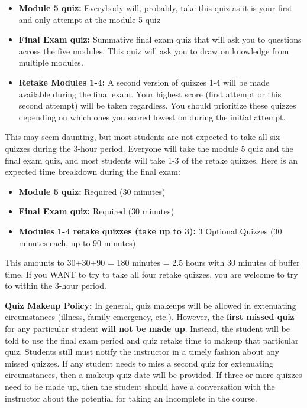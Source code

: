 \documentclass[12pt]{article}
\begin{document}
\begin{itemize}
\item  \textbf{Module 5 quiz:} Everybody will, probably, take this quiz as it is your first and only attempt at the module 5 quiz
\item \textbf{Final Exam quiz:} Summative final exam quiz that will ask you to questions across the five modules. This quiz will ask you to draw on knowledge from multiple modules.
\item \textbf{Retake Modules 1-4:} A second version of quizzes 1-4 will be made available during the final exam. Your highest score (first attempt or this second attempt) will be taken regardless. You should prioritize these quizzes depending on which ones you scored lowest on during the initial attempt.
\end{itemize}

This may seem daunting, but most students are not expected to take all six quizzes during the 3-hour period. Everyone will take the module 5 quiz and the final exam quiz, and most students will take 1-3 of the retake quizzes. Here is an expected time breakdown during the final exam:

\begin{itemize}
\item  \textbf{Module 5 quiz:} Required (30 minutes)
\item  \textbf{Final Exam quiz:} Required (30 minutes)
\item  \textbf{Modules 1-4 retake quizzes (take up to 3):} 3 Optional Quizzes (30 minutes each, up to 90 minutes)
\end{itemize}

This amounts to 30+30+90 = 180 minutes = 2.5 hours with 30 minutes of buffer time. If you WANT to try to take all four retake quizzes, you are welcome to try to within the 3-hour period. 



\textbf{Quiz Makeup Policy:} In general, quiz makeups will be allowed in extenuating circumstances (illness, family emergency, etc.). However, the \textbf{first missed quiz} for any particular student \textbf{will not be made up}. Instead, the student will be told to use the final exam period and quiz retake time to makeup that particular quiz. Students still must notify the instructor in a timely fashion about any missed quizzes. If any student needs to miss a second quiz for extenuating circumstances, then a makeup quiz date will be provided. If three or more quizzes need to be made up, then the student should have a conversation with the instructor about the potential for taking an Incomplete in the course. 
\end{document}
